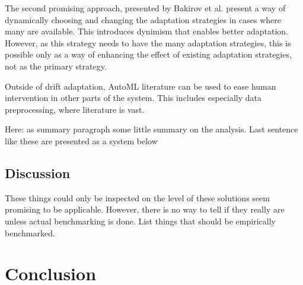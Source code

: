 The second promising approach, presented by Bakirov et al. \cite{bakirovAutomatedAdaptationStrategies2021} present a way of dynamically choosing and changing the adaptation strategies in cases where many are available. This introduces dynimism that enables better adaptation. However, as this strategy needs to have the many adaptation strategies, this is possible only as a way of enhancing the effect of existing adaptation strategies, not as the primary strategy.

Outside of drift adaptation, AutoML literature can be used to ease human intervention in other parts of the system. This includes especially data preprocessing, where literature is vast.





Here: as summary paragraph some little summary on the analysis. Last sentence like these are presented as a system below

\section{Discussion}

These things could only be inspected on the level of these solutions seem promising to be applicable. However, there is no way to tell if they really are unless actual benchmarking is done. List things that should be empirically benchmarked.

\chapter{Conclusion}

